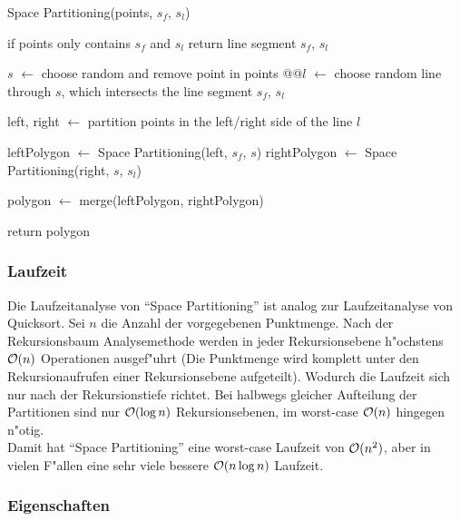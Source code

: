 \begin{code}[caption={Rekursion Space Partitioning}, 
            mathescape=true, escapeinside={@}{@}]
Space Partitioning(points, $s_f$, $s_l$)

  if points only contains $s_f$ and $s_l$
    return line segment $s_f$, $s_l$

  $s$ $\leftarrow$ choose random and remove point in points
  @\label{lst:space_line}@$l$ $\leftarrow$ choose random line through $s$, which intersects the line segment $s_f$, $s_l$

  left, right $\leftarrow$ partition points in the left/right side of the line $l$

  leftPolygon $\leftarrow$ Space Partitioning(left, $s_f$, $s$)
  rightPolygon $\leftarrow$ Space Partitioning(right, $s$, $s_l$)

  polygon $\leftarrow$ merge(leftPolygon, rightPolygon)

  return polygon
\end{code}

  \subsubsection{Laufzeit}

    Die Laufzeitanalyse von \enquote{Space Partitioning} ist analog zur
    Laufzeitanalyse von Quicksort. Sei $n$ die Anzahl der vorgegebenen
    Punktmenge. Nach der Rekursionsbaum Analysemethode werden in jeder
    Rekursionsebene  h"ochstens $\mathcal{O}(n)$ Operationen ausgef"uhrt (Die
    Punktmenge wird komplett unter den Rekursionaufrufen einer Rekursionsebene
    aufgeteilt). Wodurch die Laufzeit sich nur nach der Rekursionstiefe richtet.
    Bei halbwegs gleicher Aufteilung der Partitionen sind nur $\mathcal{O}(\log n)$
    Rekursionsebenen, im worst-case $\mathcal{O}(n)$ hingegen n"otig.
    \\ Damit hat \enquote{Space Partitioning} eine worst-case Laufzeit von
    $\mathcal{O}(n^2)$, aber in vielen F"allen eine sehr viele bessere $\mathcal{O}(n \log
    n)$ Laufzeit.

  \subsubsection{Eigenschaften}

